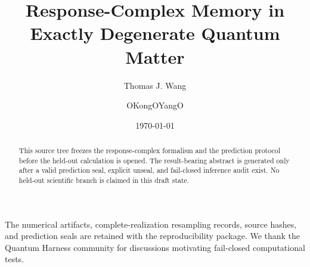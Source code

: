 \documentclass[aps,prl,reprint,superscriptaddress,longbibliography,floatfix]{revtex4-2}
\begin{document}
\title{Response-Complex Memory in Exactly Degenerate Quantum Matter}

\author{Thomas J. Wang}

\author{OKongOYangO}

\date{\today}

\begin{abstract}
\ifheldoutcomplete
\HeldoutAbstract
\else
This source tree freezes the response-complex formalism and the prediction protocol before the held-out calculation is opened. The result-bearing abstract is generated only after a valid prediction seal, explicit unseal, and fail-closed inference audit exist. No held-out scientific branch is claimed in this draft state.
\fi
\end{abstract}

\maketitle







\begin{acknowledgments}
The numerical artifacts, complete-realization resampling records, source hashes, and prediction seals are retained with the reproducibility package. We thank the Quantum Harness community for discussions motivating fail-closed computational tests.
\end{acknowledgments}


\end{document}
